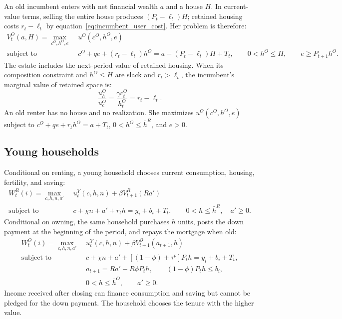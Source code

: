 \documentclass[10pt]{article}
\theoremstyle{definition}
\begin{document}
An old incumbent enters with net financial wealth $a$ and a house $H$. In
current-value terms, selling the entire house produces $(P_t-\ell_t)H$;
retained housing costs $r_t-\ell_t$ by
equation~\eqref{eq:incumbent_user_cost}. Her problem is therefore:
\begin{align}
 V_t^O(a,H)=\max_{c^O,h^O,e}\;&u^O(c^O,h^O,e)
 \label{eq:old_owner_problem}\\
 \text{subject to}\quad
 &c^O+q e+(r_t-\ell_t)h^O
 =a+(P_t-\ell_t)H+T_t,\qquad 0<h^O\leq H,
 \qquad e\geq P_{t+1}h^O.\nonumber
\end{align}
The estate includes the next-period value of retained housing. When its
composition constraint and $h^O\leq H$ are slack and $r_t>\ell_t$, the
incumbent's marginal value of retained space is:
\begin{equation}
 \frac{u_h^O}{u_c^O}=\frac{\gamma c_t^O}{h_t^O}=r_t-\ell_t.
 \label{eq:old_marginal_value}
\end{equation}
An old renter has no house and no realization. She maximizes
$u^O(c^O,h^O,e)$ subject to
$c^O+qe+r_th^O=a+T_t$, $0<h^O\leq\bar h^R$, and $e>0$.

\subsection{Young households}

Conditional on renting, a young household chooses current consumption,
housing, fertility, and saving:
\begin{align}
 W_t^R(i)=\max_{c,h,n,a'}\;&u_t^Y(c,h,n)+\beta V_{t+1}^R(Ra')
 \label{eq:young_renter_problem}\\
 \text{subject to}\quad
 &c+\chi n+a'+r_th=y_i+b_i+T_t,\qquad
 0<h\leq\bar h^R,\quad a'\geq0.\nonumber
\end{align}
Conditional on owning, the same household purchases $h$ units, posts the down
payment at the beginning of the period, and repays the mortgage when old:
\begin{align}
 W_t^O(i)=\max_{c,h,n,a'}\;&u_t^Y(c,h,n)
 +\beta V_{t+1}^O(a_{t+1},h)
 \label{eq:young_owner_problem}\\
 \text{subject to}\quad
 &c+\chi n+a'+[(1-\phi)+\tau^p]P_th=y_i+b_i+T_t,\nonumber\\
 &a_{t+1}=Ra'-R\phi P_th,\qquad
 (1-\phi)P_th\leq b_i,\nonumber\\
 &0<h\leq\bar h^O,\qquad a'\geq0.\nonumber
\end{align}
Income received after closing can finance consumption and saving but cannot be
pledged for the down payment. The household chooses the tenure with the higher
value.
\end{document}
